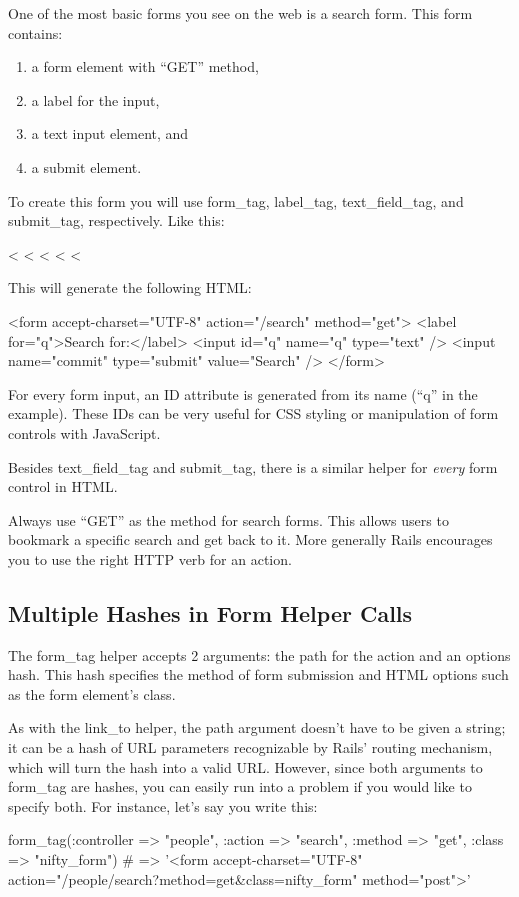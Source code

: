 \documentclass[10pt]{book}
\newenvironment{code}{%
  \scriptsize
    \verbatim
}{%
    \endverbatim
    \newline
}
\begin{document}
One of the most basic forms you see on the web is a search form. This form contains:
\begin{enumerate}
	\item a form element with “GET” method,
	\item a label for the input,
	\item a text input element, and
	\item a submit element.
\end{enumerate}

To create this form you will use form\_tag, label\_tag, text\_field\_tag, and submit\_tag, respectively. Like this:
\begin{code}
<%
  <%
  <%
  <%
<%
\end{code}

This will generate the following HTML:
\begin{code}
<form accept-charset="UTF-8" action="/search" method="get">
  <label for="q">Search for:</label>
  <input id="q" name="q" type="text" />
  <input name="commit" type="submit" value="Search" />
</form>
\end{code}

For every form input, an ID attribute is generated from its name (“q” in the example). These IDs can be very useful for CSS styling or manipulation of form controls with JavaScript.

Besides text\_field\_tag and submit\_tag, there is a similar helper for \emph{every} form control in HTML.

Always use “GET” as  the method for search forms. This allows users to bookmark a specific  search and get back to it. More generally Rails encourages you to use  the right HTTP verb for an action.

\subsection{ Multiple Hashes in Form Helper Calls}

The form\_tag helper accepts 2 arguments: the path for the action and an options hash. This hash specifies the method of form submission and HTML options such as the form element’s class.

As with the link\_to helper, the path argument doesn’t have to be given a string; it can be a hash of URL parameters recognizable by Rails’ routing mechanism, which will turn the hash into a valid URL. However, since both arguments to form\_tag are hashes, you can easily run into a problem if you would like to specify both. For instance, let’s say you write this:
\begin{code}
form_tag(:controller => "people", :action => "search", 
         :method => "get", :class => "nifty_form")
# => '<form accept-charset="UTF-8" 
            action="/people/search?method=get&class=nifty_form" 
            method="post">'
\end{code}
\end{document}
